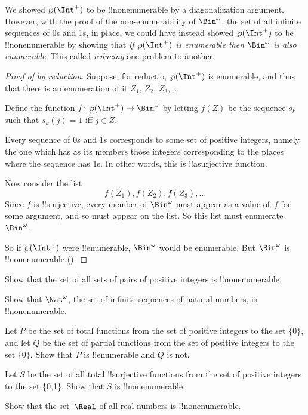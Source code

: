 \documentclass[../../include/open-logic-section]{subfiles}
\begin{document}


We showed $\Pow{\Int^+}$ to be !!{nonenumerable} by a diagonalization
argument. However, with the proof of the non-enumerability of
$\Bin^\omega$, the set of all infinite sequences of 0s and 1s, in
place, we could have instead showed $\Pow{\Int^+}$ to be
!!{nonenumerable} by showing that \emph{if $\Pow{\Int^+}$ is
  enumerable then $\Bin^\omega$ is also enumerable}. This called
\emph{reducing} one problem to another.

\begin{proof}[Proof of {} by reduction]
Suppose, for reductio, $\Pow{\Int^+}$ is enumerable, and thus that
there is an enumeration of it $Z_{1}$, $Z_{2}$, $Z_{3}$, \dots

Define the function $f \colon \Pow{\Int^+} \to \Bin^\omega$ by letting
$f(Z)$ be the sequence $s_{k}$ such that $s_{k}(j) = 1$ iff $j \in Z$.

Every sequence of 0s and 1s corresponds to some set of positive
integers, namely the one which has as its members those integers
corresponding to the places where the sequence has 1s. In other
words, this is !!a{surjective} function.

Now consider the list
\[
f(Z_1), f(Z_2), f(Z_3), \dots
\]
Since $f$ is !!{surjective}, every member of $\Bin^\omega$ must
appear as a value of~$f$ for some argument, and so must appear on the
list. So this list must enumerate~$\Bin^\omega$.

So if $\Pow{\Int^+}$ were !!{enumerable}, $\Bin^\omega$ would be enumerable.
But $\Bin^\omega$ is !!{nonenumerable} ().
\end{proof}

\begin{prob}
Show that the set of all sets of pairs of positive integers is
!!{nonenumerable}.
\end{prob}

\begin{prob}
Show that $\Nat^\omega$, the set of infinite sequences of
natural numbers, is !!{nonenumerable}.
\end{prob}

\begin{prob}
Let $P$ be the set of total functions from the set of positive
integers to the set $\{0\}$, and let $Q$ be the set of partial
functions from the set of positive integers to the set $\{0\}$. Show
that $P$ is !!{enumerable} and $Q$ is not.
\end{prob}

\begin{prob}
Let $S$ be the set of all total !!{surjective} functions from the set
of positive integers to the set \{0,1\}. Show that $S$ is
!!{nonenumerable}.
\end{prob}

\begin{prob}
Show that the set~$\Real$ of all real numbers is !!{nonenumerable}.
\end{prob}
\end{document}
